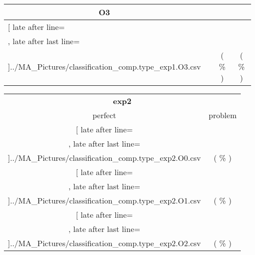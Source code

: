 \begin{table}[!htbp]
{\begin{tabular}{l|c|c|c}
\multicolumn{1}{c}{\bfseries O3}
	\\\midrule
	\csvreader[ late after line=\\, late after last line=\\\bottomrule]{../MA_Pictures/classification_comp.type_exp1.O3.csv}{
}
	{\csvcolii  &  \csvcolxii & \csvcolxiii ( \csvcolxiv \% ) & \csvcolxv ( \csvcolxvi \% )}%


    	\end{tabular}

	\begin{tabular}{|c|c}%

	\toprule
    \multicolumn{2}{c}{\bfseries exp2}\\
	
	     perfect &  problem %
	\\\midrule
	\csvreader[ late after line=\\, late after last line=\\\midrule]{../MA_Pictures/classification_comp.type_exp2.O0.csv}{
}
	{\csvcolxiii ( \csvcolxiv \% ) & \csvcolxv ( \csvcolxvi \% )}%
\multicolumn{1}{c}{}

	\\\midrule
	\csvreader[ late after line=\\, late after last line=\\\midrule]{../MA_Pictures/classification_comp.type_exp2.O1.csv}{
}
	{\csvcolxiii ( \csvcolxiv \% ) & \csvcolxv ( \csvcolxvi \% )}%
	
	\multicolumn{1}{c}{}

	\\\midrule
	\csvreader[ late after line=\\, late after last line=\\\midrule]{../MA_Pictures/classification_comp.type_exp2.O2.csv}{
}
	{\csvcolxiii ( \csvcolxiv \% ) & \csvcolxv ( \csvcolxvi \% )}%
	

\end{tabular}}
\end{table}
